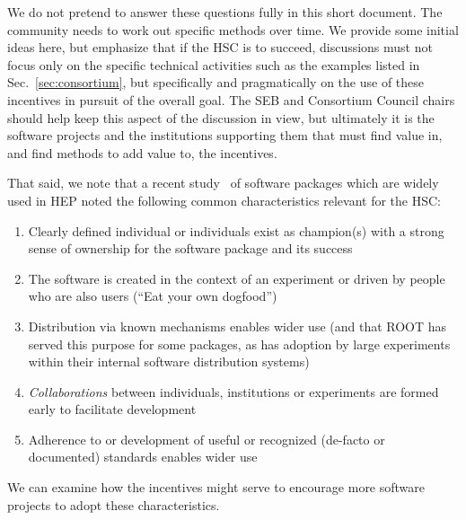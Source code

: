 \documentclass[12pt,letterpaper,fleqn]{article}
\begin{document}
We do not pretend to answer these questions fully in this short
document. The community needs to work out specific methods over time. 
We provide some initial ideas here, but emphasize that if the HSC is to 
succeed, discussions must not focus only on the specific technical 
activities such as the examples listed in Sec.~\ref{sec:consortium}, but 
specifically and pragmatically on the use of these incentives in pursuit 
of the 
overall goal. The SEB and Consortium Council chairs should help keep
this aspect of the discussion in view, but ultimately it is the software 
projects and the institutions supporting them that must find value in,
and find methods to add value to, the incentives.

That said, we note that a recent study~\cite{TAXONOMY} of software packages which are 
widely used in HEP noted the following common characteristics relevant 
for the HSC:
\begin{enumerate}
\item Clearly defined individual or individuals exist as champion(s)
with a strong sense of ownership for the software package and its success
\item The software is created in the context of an experiment or
driven by people who are also users (``Eat your own dogfood'')
\item Distribution via known mechanisms enables wider use (and that ROOT 
has served this purpose for some packages, as has adoption by large
experiments within their internal software distribution systems)
\item {\em Collaborations} between individuals, institutions or
experiments are formed early to facilitate development
\item Adherence to or development of useful or recognized (de-facto
or documented) standards enables wider use
\end{enumerate}
We can examine how the incentives might serve to encourage more software 
projects to adopt these characteristics.
\end{document}
